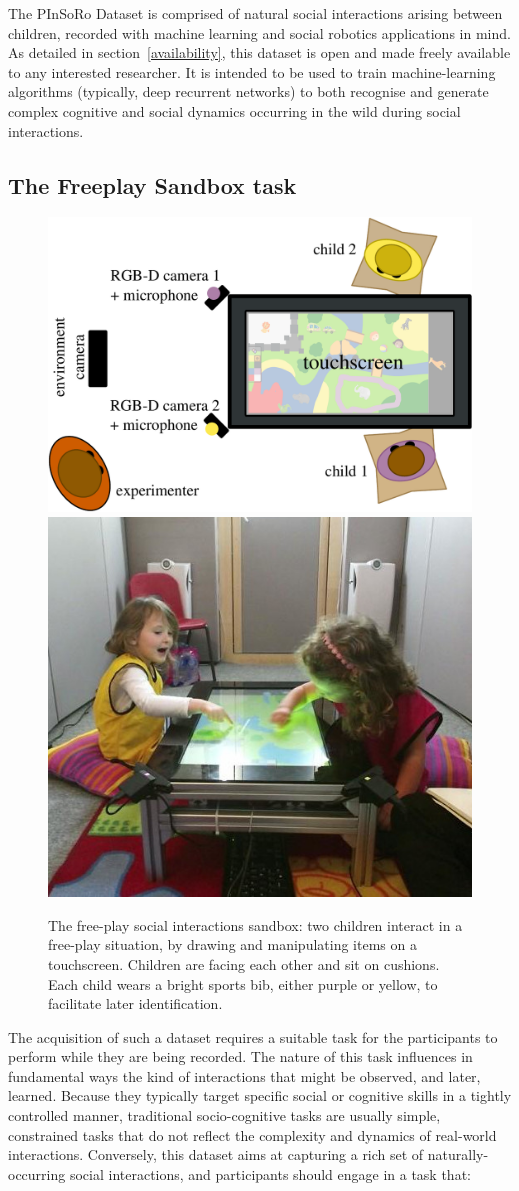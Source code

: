 \documentclass{article}
\begin{document}
The PInSoRo Dataset is comprised of natural
social interactions arising between children, recorded with machine learning
and social robotics applications in mind. 
As detailed in section~\ref{availability}, this dataset is open and made freely
available to any interested researcher. It is intended to be used to train
machine-learning algorithms (typically, deep recurrent networks) to both
recognise and generate complex cognitive and social dynamics occurring in the
wild during social interactions.

\subsection{The Freeplay Sandbox task}

\begin{figure}
    \centering
    \includegraphics[width=0.55\linewidth]{setup_child_child_top}
    \hspace{1em}
    \includegraphics[width=0.4\linewidth]{child-child-env}
    \caption{The free-play social interactions sandbox: two children interact in
    a free-play situation, by drawing and manipulating items on a touchscreen.
    Children are facing each other and sit on cushions. Each child wears a
    bright sports bib, either purple or yellow, to facilitate later
    identification.}

    \label{fig|freeplay}
\end{figure}

The acquisition of such a dataset requires a suitable
task for the participants to perform while they are being recorded. The nature of
this task influences in fundamental ways the kind of interactions that might be
observed, and later, learned. Because they typically target specific social
or cognitive skills in a tightly controlled manner, traditional socio-cognitive tasks are
usually simple, constrained tasks that do not reflect the complexity and dynamics of
real-world interactions. Conversely, this dataset aims at capturing a rich set
of naturally-occurring social interactions, and participants should engage in a task that:
\end{document}
